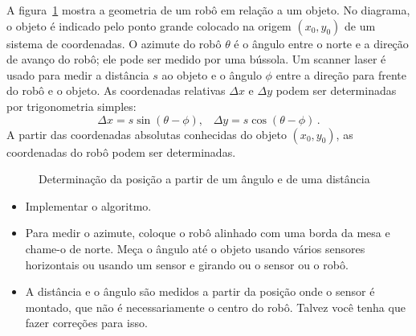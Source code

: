 A figura~\ref{fig.angle-distance} mostra a geometria de um robô em relação a um objeto. No diagrama, o objeto é indicado pelo ponto grande colocado na origem $(x_0,y_0)$ de um sistema de coordenadas. O azimute do robô $\theta$ é o ângulo entre o norte e a direção de avanço do robô; ele pode ser medido por uma bússola. Um scanner laser é usado para medir a distância $s$ ao objeto e o ângulo $\phi$ entre a direção para frente do robô e o objeto. As coordenadas relativas $\Delta x$ e $\Delta y$ podem ser determinadas por trigonometria simples:
\[
\Delta x = s \sin (\theta-\phi), \;\;\; \Delta y = s \cos (\theta-\phi)\,.
\]
A partir das coordenadas absolutas conhecidas do objeto $(x_0,y_0)$, as coordenadas do robô podem ser determinadas.

\begin{figure}
\begin{center}
\caption{Determinação da posição a partir de um ângulo e de uma distância}\label{fig.angle-distance}
\end{center}
\end{figure}

\begin{framed}
\begin{itemize}
\item Implementar o algoritmo.
\item Para medir o azimute, coloque o robô alinhado com uma borda da mesa e chame-o de norte. Meça o ângulo até o objeto usando vários sensores horizontais ou usando um sensor e girando ou o sensor ou o robô.
\item A distância e o ângulo são medidos a partir da posição onde o sensor é montado, que não é necessariamente o centro do robô. Talvez você tenha que fazer correções para isso.
\end{itemize}
\end{framed}

